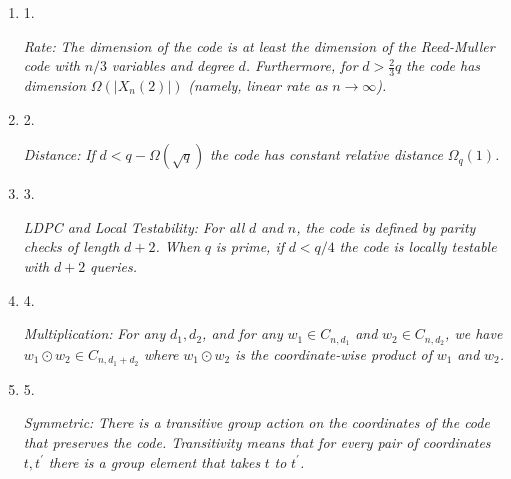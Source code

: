 \begin{enumerate}


\item[] 
1. 


\emph{Rate:}\emph{ The dimension of the code is at least the dimension of the Reed-Muller code with }$n/3$\emph{ variables and degree }$d$\emph{. Furthermore, for }$d>\frac{2}{3}q$\emph{ the code has dimension }$\Omega(\lvert X_{n}(2)\rvert)$\emph{ (namely, linear rate as }$n\to\infty$\emph{).}\par





\item[] 
2. 


\emph{Distance:}\emph{ If }$d<q-\Omega(\sqrt{q})$\emph{ the code has constant relative distance }$\Omega_{q}(1)$\emph{.}\par





\item[] 
3. 


\emph{LDPC and Local Testability:}\emph{
For all }$d$\emph{ and }$n$\emph{, the code is defined by parity checks of length }$d+2$\emph{. When }$q$\emph{ is prime, if }$d<q/4$\emph{ the code is locally testable with }$d+2$\emph{ queries.}\par





\item[] 
4. 


\emph{Multiplication:}\emph{ For any }$d_{1},d_{2}$\emph{, and for any }$w_{1}\in C_{n,d_{1}}$\emph{ and }$w_{2}\in C_{n,d_{2}}$\emph{, we have }$w_{1}\odot w_{2}\in C_{n,d_{1}+d_{2}}$\emph{ where }$w_{1}\odot w_{2}$\emph{ is the coordinate-wise product of }$w_{1}$\emph{ and }$w_{2}$\emph{.}\par





\item[] 
5. 


\emph{Symmetric:}\emph{ There is a transitive group action on the coordinates of the code that preserves the code. Transitivity means that for every pair of coordinates }$t,t^{\prime}$\emph{ there is a group element that takes }$t$\emph{ to }$t^{\prime}$\emph{.}\par





\end{enumerate}



